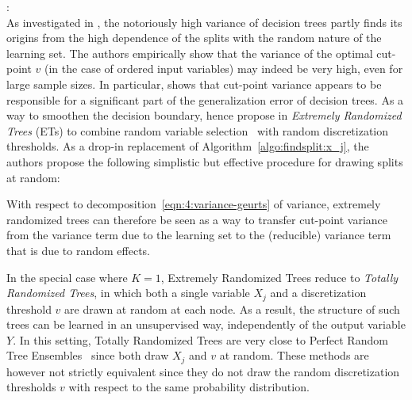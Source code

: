 \begin{description}
\item \citet{geurts:2006}: \hfill \\
    As investigated in \citep{wehenkel:1997,geurts:2000},  the notoriously high
    variance of decision trees partly finds its origins from the high
    dependence of the splits with the random nature of the learning set. The
    authors empirically show that the variance of the optimal cut-point $v$ (in
    the case of ordered input variables) may indeed be very high, even for
    large sample sizes.  In particular, \citet{geurts:2002} shows that cut-point
    variance appears to be responsible for a significant part of the
    generalization error of decision trees. As a way to smoothen the decision
    boundary, \citet{geurts:2006} hence propose in \textit{Extremely Randomized
    Trees} (ETs) to combine random variable selection~\citep{amit:1997} with
    random discretization thresholds. As a drop-in replacement of Algorithm~\ref{algo:findsplit:x_j},
    the authors propose the following simplistic but effective
    procedure for drawing splits at random:
    \begin{algorithm}\label{algo:findsplit:et}
    Draw a random split on $X_j$ that partitions ${\cal L}_t$.
    \textnormal{
    \begin{algorithmic}[1]
    \Function{FindRandomSplit-ETs}{${\cal L}_t$, $X_j$}
        \State $\min_j = \min(\{ x_{i,j} | (\mathbf{x}_i,y_i) \in {\cal L}_t \})$
        \State $\max_j = \max(\{ x_{i,j} | (\mathbf{x}_i,y_i) \in {\cal L}_t \})$
        \State Draw $v$ uniformly at random from $[\min_j, \max_j[$
        \State \Return $s^v$
    \EndFunction
    \end{algorithmic}
    }
    \end{algorithm}
    With respect to decomposition~\ref{eqn:4:variance-geurts} of variance,
    extremely randomized trees can therefore be seen as a way to transfer
    cut-point variance from the variance term due to the learning
    set to the (reducible) variance term that is due to random effects.

    In the special case where $K=1$, Extremely Randomized Trees reduce to
    \textit{Totally Randomized Trees}, in which both a single variable $X_j$
    and a discretization threshold $v$ are drawn at random at each node. As a
    result, the structure of such trees can be learned in an unsupervised way,
    independently of the output variable $Y$. In this setting, Totally
    Randomized Trees are very close to Perfect Random Tree
    Ensembles~\citep{cutler:2001} since both draw $X_j$ and $v$ at random.
    These methods are however not strictly equivalent since they do not draw
    the random discretization thresholds $v$ with respect to the same
    probability distribution.


\end{description}
